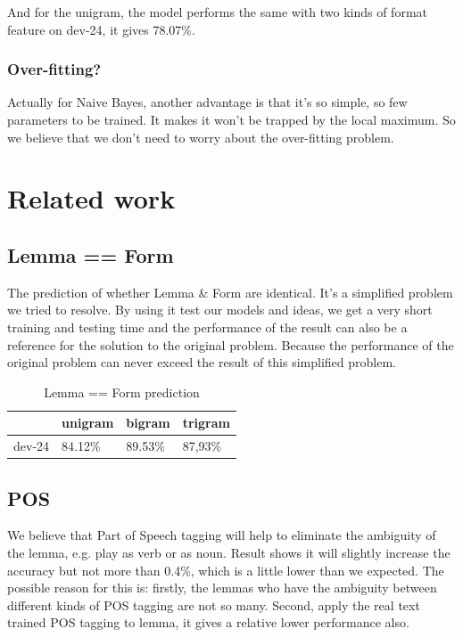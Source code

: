 \documentclass[a4paper]{article}
\begin{document}
And for the unigram, the model performs the same with two kinds of format feature on dev-24, it gives 78.07\%.


\subsubsection{Over-fitting?}
Actually for Naive Bayes, another advantage is that it's so simple, so few parameters to be trained. It makes it won't be trapped by the local maximum. So we believe that we don't need to worry about the over-fitting problem.


\section{Related work}
\subsection*{Lemma == Form}
The prediction of whether Lemma \& Form are identical. It's a simplified problem we tried to resolve. By using it test our models and ideas, we get a very short training and testing time and the performance of the result can also be a reference for the solution to the original problem. Because the performance of the original problem can never exceed the result of this simplified problem.

\begin{table}[htp]
\centering
\begin{tabular}{|l|l|l|l|}
\hline
       & unigram & bigram & trigram \\ \hline
dev-24 & 84.12\%   & 89.53\%  & 87,93\%   \\ \hline
\end{tabular}
\caption{Lemma == Form prediction}
\label{tb:lemma_eq_tb}
\end{table}

\subsection*{POS}
We believe that Part of Speech tagging will help to eliminate the ambiguity of the lemma, e.g. play as verb or as noun. Result shows it will slightly increase the accuracy but not more than 0.4\%, which is a little lower than we expected. The possible reason for this is: firstly, the lemmas who have the ambiguity between different kinds of POS tagging are not so many. Second, apply the real text trained POS tagging to lemma, it gives a relative lower performance also.
\end{document}
